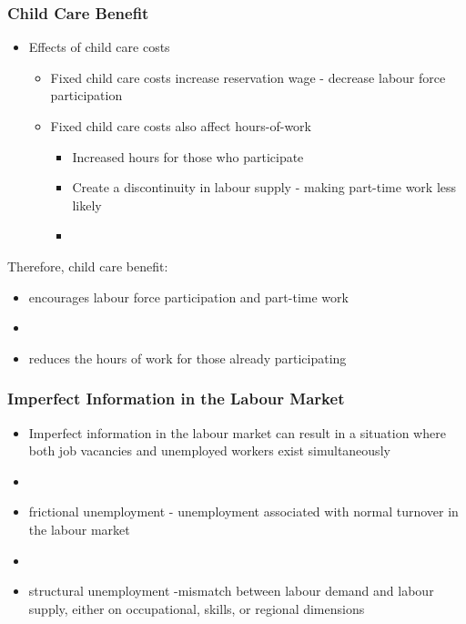 \documentclass[blue]{beamer}
\begin{document}
 
 
  \begin{frame} \frametitle{Child Care Benefit}
\label{Child Care Benefit}

\begin{itemize}


\item Effects of child care costs

\begin{itemize}
\item Fixed child care costs increase reservation wage - decrease labour force participation

\item Fixed child care costs also affect hours-of-work
\begin{itemize}
\item Increased hours for those who participate
\item Create a discontinuity in labour supply -  making part-time work less likely
\item[]
\end{itemize}
\end{itemize}
\end{itemize}

Therefore,  child care benefit:
\begin{itemize}
\item encourages labour force participation and part-time work
\item[]
\item reduces the hours of work for those already participating
 \end{itemize}
 \end{frame}
 
 
 
 
   \begin{frame} \frametitle{Imperfect Information in the Labour Market}
\label{imperfect info and labour market}

\begin{itemize}
\item Imperfect information in the labour market can result in a situation where both job vacancies and unemployed workers exist simultaneously
\item[]
\item frictional unemployment - unemployment associated with normal turnover in the labour market
\item[]
\item structural unemployment -mismatch between labour demand and labour supply,  either on occupational,  skills, or regional dimensions


 \end{itemize}
 \end{frame}
 
\end{document}

